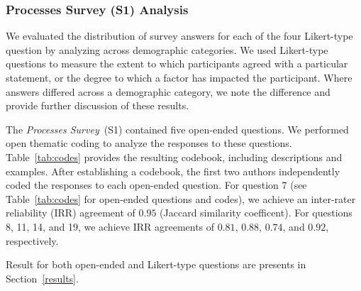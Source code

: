\subsubsection{Processes Survey (S1) Analysis}

We evaluated the distribution of survey answers for each of the four Likert-type question by analyzing across demographic categories.
We used Likert-type questions to measure the extent to which participants agreed with a particular statement, or the degree to which a factor has impacted the participant.
Where answers differed across a demographic category, we note the difference and provide further discussion of these results.

The \textit{Processes Survey}~(S1) contained five open-ended questions.
We performed open thematic coding to analyze the responses to these questions.
Table~\ref{tab:codes} provides the resulting codebook, including descriptions and examples.
After establishing a codebook, the first two authors independently coded the responses to each open-ended question.
For question 7 (see Table~\ref{tab:codes} for open-ended questions and codes), we achieve an inter-rater reliability (IRR) agreement of $0.95$ (Jaccard similarity coefficent).
For questions 8, 11, 14, and 19, we achieve IRR agreements of $0.81$, $0.88$, $0.74$, and $0.92$, respectively.

Result for both open-ended and Likert-type questions are presents in Section~\ref{results}.

